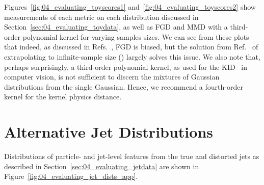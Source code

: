 Figures~\ref{fig:04_evaluating_toyscores1} and~\ref{fig:04_evaluating_toyscores2} show measurements of each metric on each distribution discussed in Section~\ref{sec:04_evaluating_toydata}, as well as FGD and MMD with a third-order polynomial kernel for varying samples sizes.
We can see from these plots that indeed, as discussed in Refs.~\cite{binkowski_demystifying, chong_unbiasedfid}, FGD is biased, but the solution from Ref.~\cite{chong_unbiasedfid} of extrapolating to infinite-sample size (\fgdinf) largely solves this issue.
We also note that, perhaps surprisingly, a third-order polynomial kernel, as used for the KID~\cite{binkowski_demystifying} in computer vision, is not sufficient to discern the mixtures of Gaussian distributions from the single Gaussian.
Hence, we recommend a fourth-order kernel for the kernel physics distance.

\section{Alternative Jet Distributions}
\label{app:04_evaluating_jet_plots} 


Distributions of particle- and jet-level features from the true and distorted jets as described in Section~\ref{sec:04_evaluating_jetdata} are shown in Figure~\ref{fig:04_evaluating_jet_dists_app}.\\

